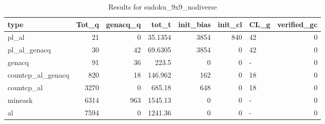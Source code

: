 \begin{table}[ht]
\caption{Results for sudoku_9x9_nodiverse}
\begin{tabular}{lrrrrrlr}
\hline
 type              &   Tot\_q &   genacq\_q &     tot\_t &   init\_bias &   init\_cl & CL\_g   &   verified\_gc \\
\hline
 pl\_al             &      21 &          0 &   35.1354 &        3854 &       840 & 42     &             0 \\
 pl\_al\_genacq      &      30 &         42 &   69.6305 &        3854 &         0 & 42     &             0 \\
 genacq            &      91 &         36 &  223.5    &           0 &         0 & -      &             0 \\
 countcp\_al\_genacq &     820 &         18 &  146.962  &         162 &         0 & 18     &             0 \\
 countcp\_al        &    3270 &          0 &  685.18   &         648 &         0 & 18     &             0 \\
 mineask           &    6314 &        963 & 1545.13   &           0 &         0 & -      &             0 \\
 al                &    7594 &          0 & 1241.36   &           0 &         0 & -      &             0 \\
\hline
\end{tabular}
\end{table}